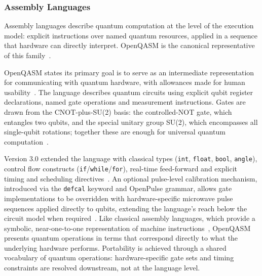\subsubsection{Assembly Languages}\label{subsubsec:lit_rev:qpl:assembly}
Assembly languages describe quantum computation at the level of the execution model: explicit instructions over named quantum resources, applied in a sequence that hardware can directly interpret.
OpenQASM is the canonical representative of this family~\cite{cross2017openqasm, cross2022openqasm3}.

OpenQASM states its primary goal is to serve as an intermediate representation for communicating with quantum hardware, with allowances made for human usability~\cite{cross2022openqasm3}.
The language describes quantum circuits using explicit qubit register declarations, named gate operations and measurement instructions.
Gates are drawn from the CNOT-plus-SU(2) basis: the controlled-NOT gate, which entangles two qubits, and the special unitary group SU(2), which encompasses all single-qubit rotations; together these are enough for universal quantum computation~\cite{cross2017openqasm}.

Version 3.0 extended the language with classical types (\texttt{int}, \texttt{float}, \texttt{bool}, \texttt{angle}), control flow constructs (\texttt{if}/\texttt{while}/\texttt{for}), real-time feed-forward and explicit timing and scheduling directives~\cite{cross2022openqasm3}.
An optional pulse-level calibration mechanism, introduced via the \texttt{defcal} keyword and OpenPulse grammar, allows gate implementations to be overridden with hardware-specific microwave pulse sequences applied directly to qubits, extending the language's reach below the circuit model when required~\cite{cross2022openqasm3}.
Like classical assembly languages, which provide a symbolic, near-one-to-one representation of machine instructions~\cite{scott2009plp}, OpenQASM presents quantum operations in terms that correspond directly to what the underlying hardware performs.
Portability is achieved through a shared vocabulary of quantum operations: hardware-specific gate sets and timing constraints are resolved downstream, not at the language level.

